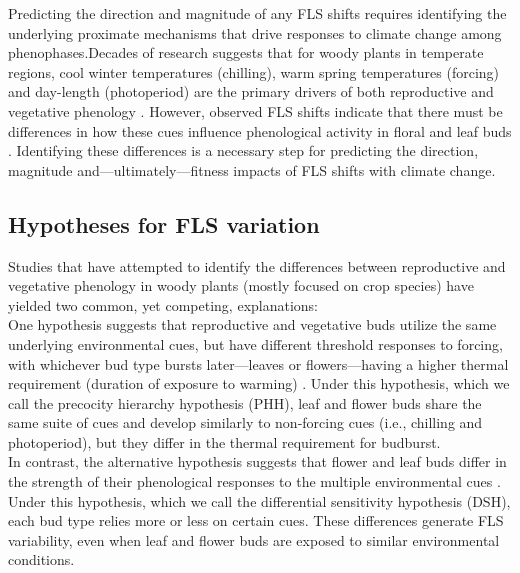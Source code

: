 \documentclass[11pt]{article}\usepackage[]{graphicx}\usepackage[]{color}
\begin{document}
\noindent Predicting the direction and magnitude of any FLS shifts requires identifying the underlying proximate mechanisms that drive responses to climate change among phenophases.Decades of research suggests that for woody plants in temperate regions, cool winter temperatures (chilling), warm spring temperatures (forcing) and day-length (photoperiod) are the primary drivers of both reproductive and vegetative phenology \citep{Forrest2010,Flynn2018}. However, observed FLS shifts indicate that there must be differences in how these cues influence phenological activity in floral and leaf buds \citep{Buonaiuto2020}.  Identifying these differences is a necessary step for predicting the direction, magnitude and---ultimately---fitness impacts of FLS shifts with climate change.\\ 

\subsection*{Hypotheses for FLS variation}

\noindent Studies that have attempted to identify the differences between reproductive and vegetative phenology in woody plants (mostly focused on crop species) have yielded two common, yet competing, explanations:\\

\noindent One hypothesis suggests that reproductive and vegetative buds utilize the same underlying environmental cues, but have different threshold responses to forcing, with whichever bud type bursts later---leaves or flowers---having a higher thermal requirement (duration of exposure to warming) \citep{Guo2014,COSMULESCU:2020aa,Cosmulescu:2018aa}. Under this hypothesis, which we call the precocity hierarchy hypothesis (PHH), leaf and flower buds share the same suite of cues and develop similarly to non-forcing cues (i.e., chilling and photoperiod), but they differ in the thermal requirement for budburst.\\

\noindent In contrast, the alternative hypothesis suggests that flower and leaf buds differ in the strength of their phenological responses to the multiple environmental cues \citep{Citadin2001,Gariglio2006,Aslani2009,Mehlenbacher:1991aa}. Under this hypothesis, which we call the differential sensitivity hypothesis (DSH), each bud type relies more or less on certain cues. These differences generate FLS variability, even when leaf and flower buds are exposed to similar environmental conditions.\\ %
\end{document}
